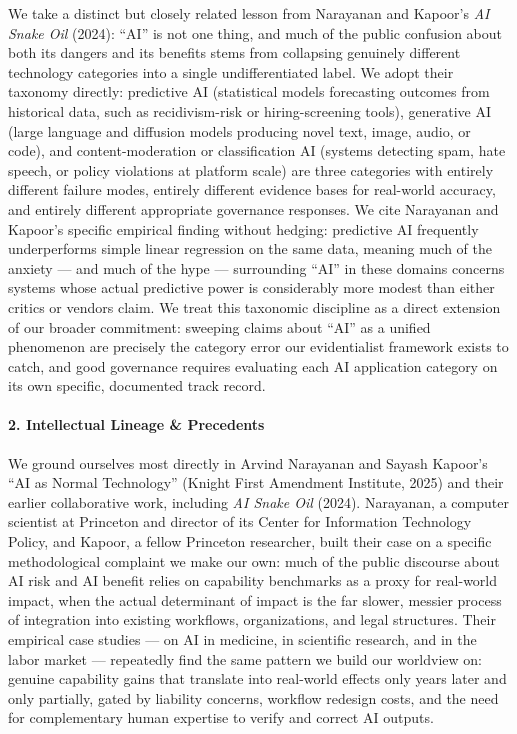 We take a distinct but closely related lesson from Narayanan and
Kapoor's \emph{AI Snake Oil} (2024): ``AI'' is not one thing, and much
of the public confusion about both its dangers and its benefits stems
from collapsing genuinely different technology categories into a single
undifferentiated label. We adopt their taxonomy directly: predictive AI
(statistical models forecasting outcomes from historical data, such as
recidivism-risk or hiring-screening tools), generative AI (large
language and diffusion models producing novel text, image, audio, or
code), and content-moderation or classification AI (systems detecting
spam, hate speech, or policy violations at platform scale) are three
categories with entirely different failure modes, entirely different
evidence bases for real-world accuracy, and entirely different
appropriate governance responses. We cite Narayanan and Kapoor's
specific empirical finding without hedging: predictive AI frequently
underperforms simple linear regression on the same data, meaning much of
the anxiety --- and much of the hype --- surrounding ``AI'' in these
domains concerns systems whose actual predictive power is considerably
more modest than either critics or vendors claim. We treat this
taxonomic discipline as a direct extension of our broader commitment:
sweeping claims about ``AI'' as a unified phenomenon are precisely the
category error our evidentialist framework exists to catch, and good
governance requires evaluating each AI application category on its own
specific, documented track record.

\paragraph{2. Intellectual Lineage \&
Precedents}\label{intellectual-lineage-precedents-20}

We ground ourselves most directly in Arvind Narayanan and Sayash
Kapoor's ``AI as Normal Technology'' (Knight First Amendment Institute,
2025) and their earlier collaborative work, including \emph{AI Snake
Oil} (2024). Narayanan, a computer scientist at Princeton and director
of its Center for Information Technology Policy, and Kapoor, a fellow
Princeton researcher, built their case on a specific methodological
complaint we make our own: much of the public discourse about AI risk
and AI benefit relies on capability benchmarks as a proxy for real-world
impact, when the actual determinant of impact is the far slower, messier
process of integration into existing workflows, organizations, and legal
structures. Their empirical case studies --- on AI in medicine, in
scientific research, and in the labor market --- repeatedly find the
same pattern we build our worldview on: genuine capability gains that
translate into real-world effects only years later and only partially,
gated by liability concerns, workflow redesign costs, and the need for
complementary human expertise to verify and correct AI outputs.

